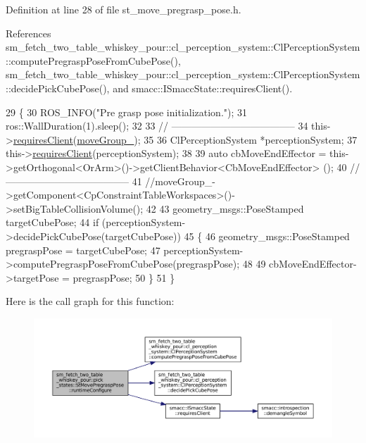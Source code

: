 Definition at line 28 of file st\+\_\+move\+\_\+pregrasp\+\_\+pose.\+h.



References sm\+\_\+fetch\+\_\+two\+\_\+table\+\_\+whiskey\+\_\+pour\+::cl\+\_\+perception\+\_\+system\+::\+Cl\+Perception\+System\+::compute\+Pregrasp\+Pose\+From\+Cube\+Pose(), sm\+\_\+fetch\+\_\+two\+\_\+table\+\_\+whiskey\+\_\+pour\+::cl\+\_\+perception\+\_\+system\+::\+Cl\+Perception\+System\+::decide\+Pick\+Cube\+Pose(), and smacc\+::\+I\+Smacc\+State\+::requires\+Client().


\begin{DoxyCode}
29             \{
30                 ROS\_INFO(\textcolor{stringliteral}{"Pre grasp pose initialization."});
31                 ros::WallDuration(1).sleep();
32 
33                 \textcolor{comment}{// --------------------------------------}
34                 this->\hyperlink{classsmacc_1_1ISmaccState_a7f95c9f0a6ea2d6f18d1aec0519de4ac}{requiresClient}(\hyperlink{structsm__fetch__two__table__whiskey__pour_1_1pick__states_1_1StMovePregraspPose_a2b6929987b87bb516e674617cce9695e}{moveGroup\_});
35                 
36                 ClPerceptionSystem *perceptionSystem;
37                 this->\hyperlink{classsmacc_1_1ISmaccState_a7f95c9f0a6ea2d6f18d1aec0519de4ac}{requiresClient}(perceptionSystem);
38 
39                 \textcolor{keyword}{auto} cbMoveEndEffector = this->getOrthogonal<OrArm>()->getClientBehavior<CbMoveEndEffector>
      ();
40                 \textcolor{comment}{// --------------------------------------}
41                 \textcolor{comment}{//moveGroup\_->getComponent<CpConstraintTableWorkspaces>()->setBigTableCollisionVolume();}
42 
43                 geometry\_msgs::PoseStamped targetCubePose;
44                 \textcolor{keywordflow}{if} (perceptionSystem->decidePickCubePose(targetCubePose))
45                 \{
46                     geometry\_msgs::PoseStamped pregraspPose = targetCubePose;
47                     perceptionSystem->computePregraspPoseFromCubePose(pregraspPose);
48 
49                     cbMoveEndEffector->targetPose = pregraspPose;
50                 \}
51             \}
\end{DoxyCode}
Here is the call graph for this function\+:
\nopagebreak
\begin{figure}[H]
\begin{center}
\leavevmode
\includegraphics[width=350pt]{structsm__fetch__two__table__whiskey__pour_1_1pick__states_1_1StMovePregraspPose_a9295013d22a3052dc8f17686f9b63aa6_cgraph}
\end{center}
\end{figure}
